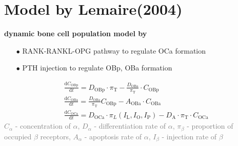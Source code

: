 \documentclass[%
aspectratio=169,  %
]{beamer}
\begin{document}
\section{Model by Lemaire(2004)}
\begin{frame}
\textbf{dynamic bone cell population model by \cite{Lemaire.2004}}
\begin{itemize}
\item[$\bullet$] RANK-RANKL-OPG pathway to regulate OCa formation
\item [$\bullet$]  PTH injection to regulate OBp, OBa formation
\end{itemize}
\begin{subequations}
	\begin{align}
		& \frac{\text{d} C_\text{OBp}}{\text{d} t} = D_\text{OBp} \cdot \pi_\text{T} - \frac{D_\text{OBa}}{\pi_\text{T}} \cdot C_\text{OBp}\\
		& \frac{\text{d} C_\text{OBa}}{\text{d} t} = \frac{D_\text{OBa}}{\pi_\text{T}} C_\text{OBp} - A_\text{OBa} \cdot C_\text{OBa} \\
		& \frac{\text{d} C_\text{OCa}}{\text{d} t} = D_\text{OCa} \cdot \pi_L(I_\text{L}, I_\text{O}, I_\text{P}) - D_\text{A} \cdot \pi_\text{T}\cdot C_\text{OCa}
	\end{align}
	\label{eq:mode1}
\end{subequations}
\textcolor{gray}{$C_\alpha$ - concentration of $\alpha$, $D_\alpha$ - differentiation rate of $\alpha$, $\pi_\beta$ - proportion of occupied $\beta$ receptors, $A_\alpha$ - apoptosis rate of $\alpha$, $I_\beta$ - injection rate of $\beta$}
\end{frame}
\end{document}
